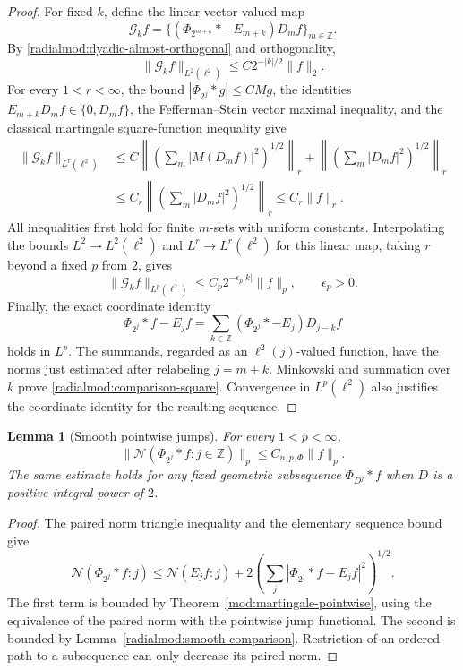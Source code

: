\documentclass[11pt]{article}
\numberwithin{equation}{section}
\newtheorem{lemma}[theorem]{Lemma}
\theoremstyle{remark}
\theoremstyle{definition}
\begin{document}
\begin{proof}
For fixed $k$, define the linear vector-valued map
\[
 \mathcal G_k f
 =\{(\Phi_{2^{m+k}}*-E_{m+k})D_mf\}_{m\in\mathbb Z}.
\]
By \eqref{radialmod:dyadic-almost-orthogonal} and orthogonality,
\[
 \|\mathcal G_k f\|_{L^2(\ell^2)}
 \le C2^{-|k|/2}\|f\|_2.
\]
For every $1<r<\infty$, the bound $|\Phi_{2^j}*g|\le C M g$,
the identities $E_{m+k}D_mf\in\{0,D_mf\}$, the Fefferman--Stein vector
maximal inequality, and the classical martingale square-function
inequality give
\begin{align*}
 \|\mathcal G_kf\|_{L^r(\ell^2)}
 &\le C\left\|\left(\sum_m|M(D_mf)|^2\right)^{1/2}\right\|_r
       +\left\|\left(\sum_m|D_mf|^2\right)^{1/2}\right\|_r\\
 &\le C_r\left\|\left(\sum_m|D_mf|^2\right)^{1/2}\right\|_r
 \le C_r\|f\|_r.
\end{align*}
All inequalities first hold for finite $m$-sets with uniform constants.
Interpolating the bounds $L^2\to L^2(\ell^2)$ and
$L^r\to L^r(\ell^2)$ for this linear map, taking $r$ beyond a fixed
$p$ from $2$, gives
\[
 \|\mathcal G_kf\|_{L^p(\ell^2)}
 \le C_p2^{-\epsilon_p|k|}\|f\|_p,\qquad\epsilon_p>0.
\]
Finally, the exact coordinate identity
\[
 \Phi_{2^j}*f-E_jf
 =\sum_{k\in\mathbb Z}(\Phi_{2^j}*-E_j)D_{j-k}f
\]
holds in $L^p$. The summands, regarded as an $\ell^2(j)$-valued
function, have the norms just estimated after relabeling $j=m+k$.
Minkowski and summation over $k$ prove
\eqref{radialmod:comparison-square}. Convergence in $L^p(\ell^2)$
also justifies the coordinate identity for the resulting sequence.
\end{proof}

\begin{lemma}[Smooth pointwise jumps]\label{radialmod:smooth-jump}
For every $1<p<\infty$,
\[
 \|\mathcal N(\Phi_{2^j}*f:j\in\mathbb Z)\|_p\le C_{n,p,\Phi}\|f\|_p.
\]
The same estimate holds for any fixed geometric subsequence
$\Phi_{D^j}*f$ when $D$ is a positive integral power of $2$.
\end{lemma}
\begin{proof}
The paired norm triangle inequality and the elementary sequence bound
give
\[
 \mathcal N(\Phi_{2^j}*f:j)
 \le\mathcal N(E_jf:j)
      +2\left(\sum_j|\Phi_{2^j}*f-E_jf|^2\right)^{1/2}.
\]
The first term is bounded by Theorem~\ref{mod:martingale-pointwise},
using the equivalence of the paired norm with the pointwise jump
functional. The second is bounded by
Lemma~\ref{radialmod:smooth-comparison}. Restriction of an ordered path
to a subsequence can only decrease its paired norm.
\end{proof}
\end{document}
